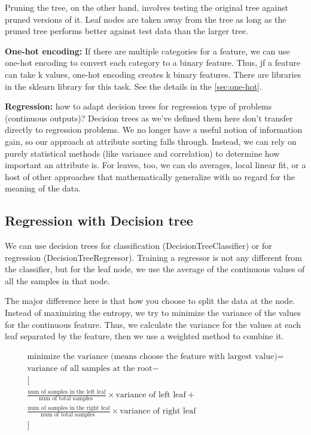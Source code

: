 \documentclass[12pt]{report}
\begin{document}
Pruning the tree, on the other hand, involves testing the original tree against pruned versions of it. Leaf nodes are taken away from the tree as long as the pruned tree performs better against test data than the larger tree.


\textbf{One-hot encoding:} If there are multiple categories for a feature, we can use one-hot encoding to convert each category to a binary feature. Thus, jf a feature can take k values, one-hot encoding creates k binary features. There are libraries in the sklearn library for this task. See the details in the \ref{sec:one-hot}.

\textbf{Regression:} how to adapt decision trees for regression type of problems (continuous outputs)? Decision trees as we’ve defined them here don’t transfer directly to regression problems. We no longer have a useful notion of information gain, so our approach at attribute sorting falls through. Instead, we can rely on purely statistical methods (like variance and correlation) to determine how important an attribute is. For leaves, too, we can do averages, local linear fit, or a host of other approaches that mathematically generalize with no regard for the meaning of the data.

\subsection{Regression with Decision tree}

We can use decision trees for classification (DecisionTreeClassifier) or for regression (DecisionTreeRegressor). Training a regressor is not any different from the classifier, but for the leaf node, we use the average of the continuous values of all the samples in that node.

The major difference here is that how you choose to split the data at the node. Instead of maximizing the entropy, we try to minimize the variance of the values for the continuous feature. Thus, we calculate the variance for the values at each leaf separated by the feature, then we use a weighted method to combine it.

\begin{multline}
	\text{minimize the variance (means choose the feature with largest value)} = \\
	\text{variance of all samples at the root} - \\
	\big[ \\
	\frac{\text{num of samples in the left leaf}}{ \text{num of total samples }} \times \text{variance of left leaf} +\\
	\frac{\text{num of samples in the right leaf}}{ \text{num of total samples }} \times \text{variance of right leaf}\\
	\big]
\end{multline}
\end{document}
